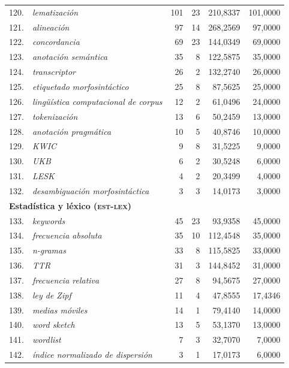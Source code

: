 \begin{longtable}{@{} r p{5cm} r r r r @{}}
\midrule
120. & \textit{lematización} & 101 & 23 & 210{,}8337 & 101{,}0000 \\
121. & \textit{alineación} & 97 & 14 & 268{,}2569 & 97{,}0000 \\
122. & \textit{concordancia} & 69 & 23 & 144{,}0349 & 69{,}0000 \\
123. & \textit{anotación semántica} & 35 & 8 & 122{,}5875 & 35{,}0000 \\
124. & \textit{transcriptor} & 26 & 2 & 132{,}2740 & 26{,}0000 \\
125. & \textit{etiquetado morfosintáctico} & 25 & 8 & 87{,}5625 & 25{,}0000 \\
126. & \textit{lingüística computacional de corpus} & 12 & 2 & 61{,}0496 & 24{,}0000 \\
127. & \textit{tokenización} & 13 & 6 & 50{,}2459 & 13{,}0000 \\
128. & \textit{anotación pragmática} & 10 & 5 & 40{,}8746 & 10{,}0000 \\
129. & \textit{KWIC} & 9 & 8 & 31{,}5225 & 9{,}0000 \\
130. & \textit{UKB} & 6 & 2 & 30{,}5248 & 6{,}0000 \\
131. & \textit{LESK} & 4 & 2 & 20{,}3499 & 4{,}0000 \\
132. & \textit{desambiguación morfosintáctica} & 3 & 3 & 14{,}0173 & 3{,}0000 \\
\midrule
\multicolumn{6}{l}{\textbf{Estadística y léxico (\textsc{est-lex})}} \\
\midrule
133. & \textit{keywords} & 45 & 23 & 93{,}9358 & 45{,}0000 \\
134. & \textit{frecuencia absoluta} & 35 & 10 & 112{,}4548 & 35{,}0000 \\
135. & \textit{n-gramas} & 33 & 8 & 115{,}5825 & 33{,}0000 \\
136. & \textit{TTR} & 31 & 3 & 144{,}8452 & 31{,}0000 \\
137. & \textit{frecuencia relativa} & 27 & 8 & 94{,}5675 & 27{,}0000 \\
138. & \textit{ley de Zipf} & 11 & 4 & 47{,}8555 & 17{,}4346 \\
139. & \textit{medias móviles} & 14 & 1 & 79{,}4140 & 14{,}0000 \\
140. & \textit{word sketch} & 13 & 5 & 53{,}1370 & 13{,}0000 \\
141. & \textit{wordlist} & 7 & 3 & 32{,}7070 & 7{,}0000 \\
142. & \textit{índice normalizado de dispersión} & 3 & 1 & 17{,}0173 & 6{,}0000 \\

\end{longtable}
